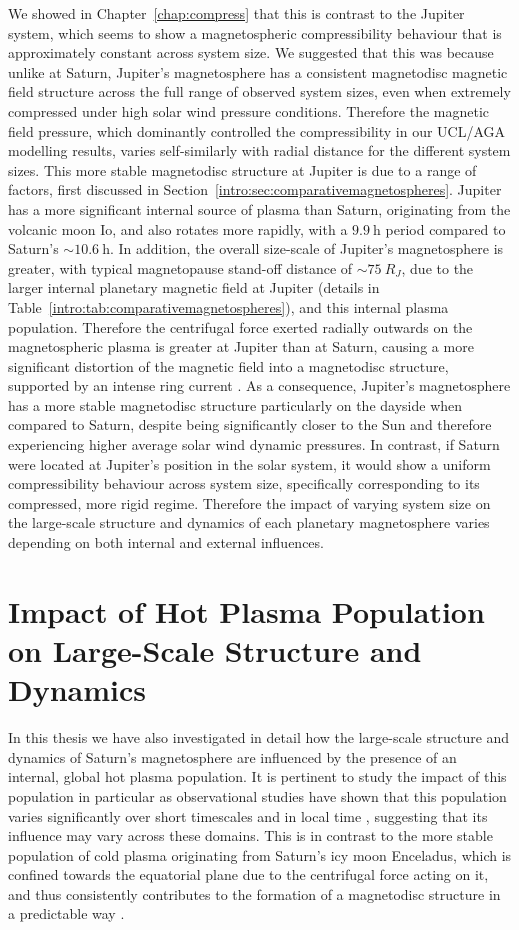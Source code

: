 We showed in Chapter~\ref{chap:compress} that this is contrast to the Jupiter system, which seems to show a magnetospheric compressibility behaviour that is approximately constant across system size. We suggested that this was because unlike at Saturn, Jupiter's magnetosphere has a consistent magnetodisc magnetic field structure across the full range of observed system sizes, even when extremely compressed under high solar wind pressure conditions. Therefore the magnetic field pressure, which dominantly controlled the compressibility in our UCL/AGA modelling results, varies self-similarly with radial distance for the different system sizes. This more stable magnetodisc structure at Jupiter is due to a range of factors, first discussed in Section~\ref{intro:sec:comparativemagnetospheres}. Jupiter has a more significant internal source of plasma than Saturn, originating from the volcanic moon Io, and also rotates more rapidly, with a $\SI{9.9}{\hour}$ period compared to Saturn's  ${\sim}\SI{10.6}{\hour}$. In addition, the overall size-scale of Jupiter's magnetosphere is  greater, with typical magnetopause stand-off distance of ${\sim}\SI{75}{R_J}$, due to the larger internal planetary magnetic field at Jupiter (details in Table~\ref{intro:tab:comparativemagnetospheres}), and this internal plasma population. Therefore the centrifugal force exerted radially outwards on the magnetospheric plasma is greater at Jupiter than at Saturn, causing a more significant distortion of the magnetic field into a magnetodisc structure, supported by an intense ring current \citep[e.g.][]{khurana2004}. As a consequence, Jupiter's magnetosphere has a more stable magnetodisc structure particularly on the dayside when compared to Saturn, despite being significantly closer to the Sun and therefore experiencing higher average solar wind dynamic pressures. In contrast, if Saturn were located at Jupiter's position in the solar system, it would show a uniform compressibility behaviour across system size, specifically corresponding to its compressed, more rigid regime. Therefore the impact of varying system size on the large-scale structure and dynamics of each planetary magnetosphere varies depending on both internal and external influences.

\section{Impact of Hot Plasma Population on Large-Scale Structure and Dynamics}
In this thesis we have also investigated in detail how the large-scale structure and dynamics of Saturn's magnetosphere are influenced by the presence of an internal, global hot plasma population. It is pertinent to study the impact of this population in particular as observational studies have shown that this population varies significantly over short timescales \citep{sergis2011} and in local time \citep{sergis2017}, suggesting that its influence may vary across these domains. This is in contrast to the more stable population of cold plasma originating from Saturn's icy moon Enceladus, which is confined towards the equatorial plane due to the centrifugal force acting on it, and thus consistently contributes to the formation of a magnetodisc structure in a predictable way \citep[e.g.][]{arridge2008}. 

